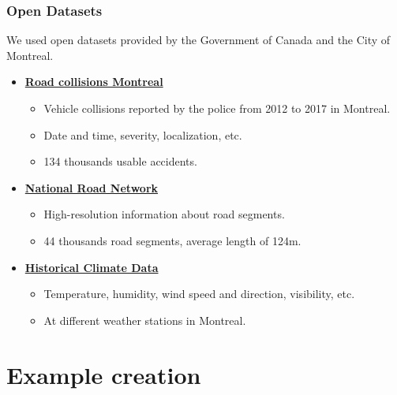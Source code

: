 \documentclass[slidestop,compress,red,mathserif]{beamer}
\begin{document}
\begin{frame}
\frametitle{Open Datasets}

\begin{footnotesize}
We used open datasets provided by the Government of Canada and the City of Montreal.

\begin{itemize}
\item[] \textbf{\href{http://donnees.ville.montreal.qc.ca/dataset/collisions-routieres}{Road collisions Montreal}}
  \begin{itemize}
  	\item Vehicle collisions reported by the police from 2012 to 2017 in Montreal.
  	\item Date and time, severity, localization, etc.
  	\item 134 thousands usable accidents.
  \end{itemize}
\item[] \textbf{\href{https://open.canada.ca/data/en/dataset/3d282116-e556-400c-9306-ca1a3cada77f}{National Road Network}}
  \begin{itemize}
    \item High-resolution information about road segments.
    \item 44 thousands road segments, average length of 124m.
  \end{itemize}
\item[] \textbf{\href{https://climate.weather.gc.ca}{Historical Climate Data}}
  \begin{itemize}
    \item Temperature, humidity, wind speed and direction, visibility, etc. 
    \item At different weather stations in Montreal.
  \end{itemize}
\end{itemize}

\end{footnotesize}

\end{frame}


\section{Example creation}
\end{document}
